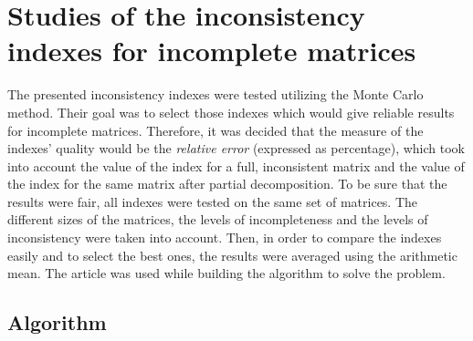 \chapter{Studies of the inconsistency indexes for incomplete matrices}
\label{sec:studiesOfInconsistencyIndexesForIncompleteMatrices}

The presented inconsistency indexes were tested utilizing the Monte Carlo method. Their goal was to select those indexes which would give reliable results for incomplete matrices. Therefore, it was decided that the measure of the indexes' quality would be the \textit{relative error} (expressed as  percentage), which took into account the value of the index for a full, inconsistent matrix and the value of the index for the same matrix after partial decomposition. To be sure that the results were fair, all indexes were tested on the same set of matrices. The different sizes of the matrices, the levels of incompleteness and the levels of inconsistency were taken into account. Then, in order to compare the indexes easily and to select the best ones, the results were averaged using the arithmetic mean. The article \cite{Kazibudzki2017} was used while building the algorithm to solve the problem.


\section{Algorithm}
